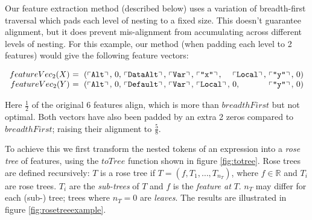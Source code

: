 Our feature extraction method (described below) uses a variation of breadth-first traversal which pads each level of nesting to a fixed size. This doesn't guarantee alignment, but it does prevent mis-alignment from accumulating across different levels of nesting. For this example, our method (when padding each level to 2 features) would give the following feature vectors:

\begin{small}
  \begin{equation*}
    \begin{array}{r@{}l@{}l@{}l@{}l@{}l@{}l@{}l@{}l@{}l}
      featureVec_2(X)\ &=\ (\feature{\CAlt},\ &0,\ &\feature{\CDataAlt},\ &\feature{\CVar},\ &\feature{\id{x}},\  &\feature{\CLocal},\ &\feature{\id{y}},\ &0 &) \\
      featureVec_2(Y)\ &=\ (\feature{\CAlt},\ &0,\ &\feature{\CDefault},\ &\feature{\CVar},\ &\feature{\CLocal},\ &0,\                 &\feature{\id{y}},\ &0 &)
    \end{array}
  \end{equation*}
\end{small}

Here $\frac{1}{2}$ of the original 6 features align, which is more than $breadthFirst$ but not optimal. Both vectors have also been padded by an extra 2 zeros compared to $breadthFirst$; raising their alignment to $\frac{5}{8}$.

To achieve this we first transform the nested tokens of an expression into a \emph{rose tree} of features, using the $toTree$ function shown in figure \ref{fig:totree}. Rose trees are defined recursively: $T$ is a rose tree if $T = (f, T_1, \dots, T_{n_T})$, where $f \in \mathbb{R}$ and $T_i$ are rose trees. $T_i$ are the \emph{sub-trees} of $T$ and $f$ is the \emph{feature at} $T$. $n_T$ may differ for each (sub-) tree; trees where $n_T = 0$ are \emph{leaves}. The results are illustrated in figure \ref{fig:rosetreeexample}.

